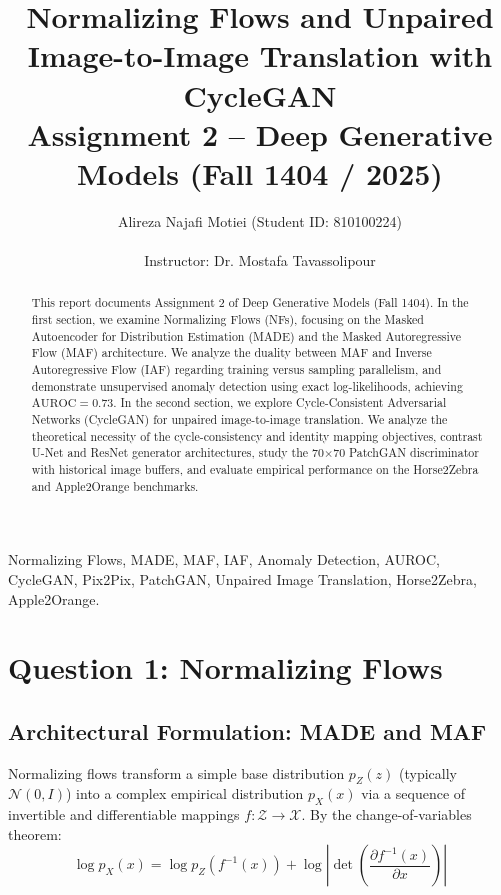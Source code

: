 \documentclass[10pt,journal,compsoc]{IEEEtran}
\begin{document}
\title{Normalizing Flows and Unpaired Image-to-Image Translation with CycleGAN\\
\large Assignment 2 -- Deep Generative Models (Fall 1404 / 2025)}

\author{Alireza Najafi Motiei (Student ID: 810100224)\\
\\
Instructor: Dr. Mostafa Tavassolipour}


\maketitle

\begin{abstract}
This report documents Assignment 2 of Deep Generative Models (Fall 1404). In the first section, we examine Normalizing Flows (NFs), focusing on the Masked Autoencoder for Distribution Estimation (MADE) and the Masked Autoregressive Flow (MAF) architecture. We analyze the duality between MAF and Inverse Autoregressive Flow (IAF) regarding training versus sampling parallelism, and demonstrate unsupervised anomaly detection using exact log-likelihoods, achieving $\text{AUROC} = 0.73$. In the second section, we explore Cycle-Consistent Adversarial Networks (CycleGAN) for unpaired image-to-image translation. We analyze the theoretical necessity of the cycle-consistency and identity mapping objectives, contrast U-Net and ResNet generator architectures, study the 70$\times$70 PatchGAN discriminator with historical image buffers, and evaluate empirical performance on the Horse2Zebra and Apple2Orange benchmarks.
\end{abstract}

\begin{IEEEkeywords}
Normalizing Flows, MADE, MAF, IAF, Anomaly Detection, AUROC, CycleGAN, Pix2Pix, PatchGAN, Unpaired Image Translation, Horse2Zebra, Apple2Orange.
\end{IEEEkeywords}

\section{Question 1: Normalizing Flows}

\subsection{Architectural Formulation: MADE and MAF}
Normalizing flows transform a simple base distribution $p_Z(z)$ (typically $\mathcal{N}(0, I)$) into a complex empirical distribution $p_X(x)$ via a sequence of invertible and differentiable mappings $f: \mathcal{Z} \to \mathcal{X}$. By the change-of-variables theorem:
\begin{equation}
\log p_X(x) = \log p_Z(f^{-1}(x)) + \log \left| \det \left( \frac{\partial f^{-1}(x)}{\partial x} \right) \right|
\end{equation}
\end{document}

